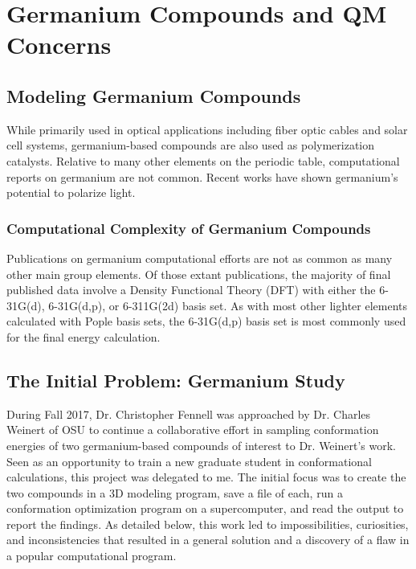 \chapter{Germanium Compounds and QM Concerns}
\label{ch:Germanium}

\section{Modeling Germanium Compounds}

While primarily used in optical applications including fiber optic cables and solar cell systems, germanium-based compounds are also used as polymerization catalysts.
Relative to many other elements on the periodic table, computational reports on germanium are not common.
Recent works have shown germanium's potential to polarize light.


\subsection{Computational Complexity of Germanium Compounds}

Publications on germanium computational efforts are not as common as many other main group elements. 
Of those extant publications, the majority of final published data involve a Density Functional Theory (DFT) with either the 6-31G(d), 6-31G(d,p), or 6-311G(2d) basis set.\cite{GeCompStudy1}
As with most other lighter elements calculated with Pople basis sets, the 6-31G(d,p) basis set is most commonly used for the final energy calculation.

\section{The Initial Problem: Germanium Study}

During Fall 2017, Dr. Christopher Fennell was approached by Dr. Charles Weinert of OSU to continue a collaborative effort in sampling conformation energies of two germanium-based compounds of interest to Dr. Weinert's work. 
Seen as an opportunity to train a new graduate student in conformational calculations, this project was delegated to me.
The initial focus was to create the two compounds in a 3D modeling program, save a file of each, run a conformation optimization program on a supercomputer, and read the output to report the findings.
As detailed below, this work led to impossibilities, curiosities, and inconsistencies that resulted in a general solution and a discovery of a flaw in a popular computational program.

